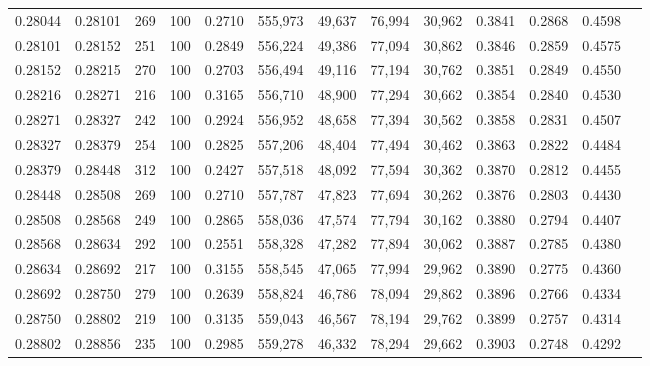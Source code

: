 \begin{tabular}{rrrrrrrrrrrrr}
0.28044 & 0.28101 &   269 & 100 &                                     0.2710 & 555,973 &  49,637 &  76,994 &  30,962 & 0.3841 & 0.2868 & 0.4598 \\
0.28101 & 0.28152 &   251 & 100 &                                     0.2849 & 556,224 &  49,386 &  77,094 &  30,862 & 0.3846 & 0.2859 & 0.4575 \\
0.28152 & 0.28215 &   270 & 100 &                                     0.2703 & 556,494 &  49,116 &  77,194 &  30,762 & 0.3851 & 0.2849 & 0.4550 \\
0.28216 & 0.28271 &   216 & 100 &                                     0.3165 & 556,710 &  48,900 &  77,294 &  30,662 & 0.3854 & 0.2840 & 0.4530 \\
0.28271 & 0.28327 &   242 & 100 &                                     0.2924 & 556,952 &  48,658 &  77,394 &  30,562 & 0.3858 & 0.2831 & 0.4507 \\
0.28327 & 0.28379 &   254 & 100 &                                     0.2825 & 557,206 &  48,404 &  77,494 &  30,462 & 0.3863 & 0.2822 & 0.4484 \\
0.28379 & 0.28448 &   312 & 100 &                                     0.2427 & 557,518 &  48,092 &  77,594 &  30,362 & 0.3870 & 0.2812 & 0.4455 \\
0.28448 & 0.28508 &   269 & 100 &                                     0.2710 & 557,787 &  47,823 &  77,694 &  30,262 & 0.3876 & 0.2803 & 0.4430 \\
0.28508 & 0.28568 &   249 & 100 &                                     0.2865 & 558,036 &  47,574 &  77,794 &  30,162 & 0.3880 & 0.2794 & 0.4407 \\
0.28568 & 0.28634 &   292 & 100 &                                     0.2551 & 558,328 &  47,282 &  77,894 &  30,062 & 0.3887 & 0.2785 & 0.4380 \\
0.28634 & 0.28692 &   217 & 100 &                                     0.3155 & 558,545 &  47,065 &  77,994 &  29,962 & 0.3890 & 0.2775 & 0.4360 \\
0.28692 & 0.28750 &   279 & 100 &                                     0.2639 & 558,824 &  46,786 &  78,094 &  29,862 & 0.3896 & 0.2766 & 0.4334 \\
0.28750 & 0.28802 &   219 & 100 &                                     0.3135 & 559,043 &  46,567 &  78,194 &  29,762 & 0.3899 & 0.2757 & 0.4314 \\
0.28802 & 0.28856 &   235 & 100 &                                     0.2985 & 559,278 &  46,332 &  78,294 &  29,662 & 0.3903 & 0.2748 & 0.4292 \\

\end{tabular}

